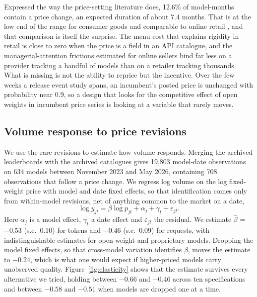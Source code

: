 \documentclass{article}
\newcommand{\MonthlyFreq}{12.6}
\newcommand{\PriceDuration}{7.4}
\newcommand{\PanelObs}{19{,}803}
\newcommand{\PanelModels}{634}
\newcommand{\PanelStart}{November 2023}
\newcommand{\PanelEnd}{May 2026}
\newcommand{\NRevisions}{708}
\newcommand{\ElastTok}{$-0.53$}
\newcommand{\ElastTokSE}{0.10}
\newcommand{\ElastReq}{$-0.46$}
\newcommand{\ElastReqSE}{0.09}
\newcommand{\ElastCross}{$-0.24$}
\begin{document}
Expressed the way the price-setting literature does, \MonthlyFreq\% of model-months
contain a price change, an expected duration of about \PriceDuration{} months. That is at
the low end of the range for consumer goods and comparable to online retail
\citep{bils2004,nakamura2008,gorodnichenko2017,cavallo2018}, and that comparison is itself
the surprise. The menu cost that explains rigidity in retail is close to zero when the price
is a field in an API catalogue, and the managerial-attention frictions estimated for online
sellers \citep{ellison2018} bind far less on a provider tracking a handful of models than on
a retailer tracking thousands. What is missing is not the ability to reprice but the
incentive. Over the few weeks a release event study spans, an incumbent's posted price is
unchanged with probability near 0.9, so a design that looks for the competitive effect of
open weights in incumbent price series is looking at a variable that rarely moves.

\subsection{Volume response to price revisions}

We use the rare revisions to estimate how volume responds. Merging the archived
leaderboards with the archived catalogues gives \PanelObs{} model-date observations on
\PanelModels{} models between \PanelStart{} and \PanelEnd{}, containing \NRevisions{}
observations that follow a price change. We regress log volume on the log fixed-weight
price with model and date fixed effects, so that identification comes only from within-model
revisions, net of anything common to the market on a date,
\begin{equation}
\log y_{jt} = \beta \log p_{jt} + \alpha_j + \gamma_t + \varepsilon_{jt} .
\label{eq:elasticity}
\end{equation}
Here $\alpha_j$ is a model effect, $\gamma_t$ a date effect and $\varepsilon_{jt}$ the
residual.
We estimate $\hat\beta$ = \ElastTok{} (s.e.\ \ElastTokSE) for tokens and \ElastReq{}
(s.e.\ \ElastReqSE) for requests, with indistinguishable estimates for open-weight and
proprietary models. Dropping the model fixed effects, so that cross-model variation
identifies $\beta$, moves the estimate to \ElastCross{}, which is what one would expect if
higher-priced models carry unobserved quality. Figure~\ref{fig:elasticity} shows that the
estimate survives every alternative we tried, holding between $-0.66$ and $-0.46$ across ten
specifications and between $-0.58$ and $-0.51$ when models are dropped one at a time.
\end{document}
